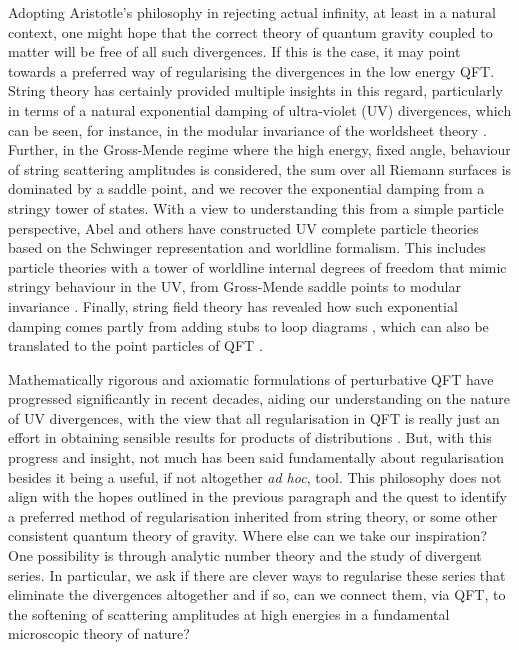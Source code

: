 \documentclass[12pt, letter]{article}
\begin{document}
 Adopting Aristotle's philosophy in rejecting actual infinity, at least in a natural context, one might hope that the correct theory of quantum gravity coupled to matter will be free of all such divergences. If this is the case, it may point towards a preferred way of regularising the   divergences in the low energy QFT.  String theory has certainly provided multiple insights in this regard, particularly in terms of a natural exponential damping of ultra-violet (UV) divergences, which can be seen, for instance, in the modular invariance of the worldsheet theory \citep{dhoker22,Polchinski98}.  Further, in the Gross-Mende regime \citep{GrossMende87,Gross:1987ar} where the high energy, fixed angle, behaviour of string scattering amplitudes is considered, the sum over all Riemann surfaces is dominated by a saddle point, and we recover the exponential damping from a stringy tower of states. With a view to understanding this from a simple particle perspective, Abel and others \citep{Abel19,Abel20} have constructed UV complete particle theories based on the Schwinger representation and  worldline formalism. This includes  particle theories with a tower of worldline internal degrees of freedom that mimic stringy behaviour in the UV, from Gross-Mende saddle points to modular invariance  \citep{Abel20}. Finally, string field theory has revealed how such exponential damping comes partly from adding stubs to loop diagrams \citep{Erbin21}, which can also be translated to the point particles of QFT \citep{Chiaffrino22}.
 
 

Mathematically rigorous and axiomatic formulations of perturbative QFT have progressed significantly in recent decades, aiding our understanding on the nature of UV divergences, with the view that all regularisation in QFT is really just an effort in obtaining sensible results for products of distributions \citep{Latorre94}. But, with this progress and insight, not much has been said fundamentally about regularisation besides it being a useful, if not altogether \textit{ad hoc}, tool.   This philosophy does not align with the hopes outlined in the previous paragraph and the quest to identify a preferred method of regularisation inherited from string theory, or some other consistent quantum theory of gravity. Where else can we take our inspiration? One possibility is through analytic number theory and the study of divergent series.  In particular, we  ask if there  are clever ways to regularise these series that eliminate the divergences altogether and if so, can we connect them, via QFT, to the softening of scattering amplitudes at high energies   in a fundamental microscopic theory of nature?
\end{document}
